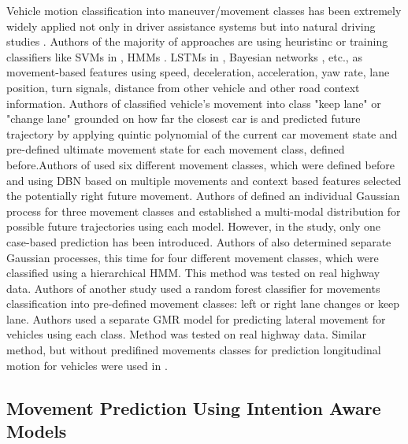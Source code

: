 Vehicle motion classification into maneuver/movement classes has been extremely widely applied not only in driver assistance systems but into natural driving studies \cite{DataDrivenIV, DataDrivenV, DataDrivenVI, mab1, mab2, mab3, mab4, mab5, mab6, mab7}. Authors of the majority of approaches are using heuristinc \cite{mab1} or training classifiers like \glspl{SVM} in \cite{mab2}, \glspl{HMM} \cite{DataDrivenIV, mab3, mab4}. \glspl{LSTM} in \cite{mab5}, Bayesian networks \cite{mab6}, etc., as movement-based features using speed, deceleration, acceleration, yaw rate, lane position, turn signals, distance from other vehicle and other road context information. Authors of \cite{mab1} classified vehicle's movement into class "keep lane" or "change lane" grounded on how far the closest car is and predicted future trajectory by applying quintic polynomial of the current car movement state and pre-defined ultimate movement state for each movement class, defined before.Authors of \cite{mab6} used six different movement classes, which were defined before and using \gls{DBN} based on multiple movements and context based features selected the potentially right future movement. Authors of \cite{mab7} defined an individual Gaussian process for three movement classes and established a multi-modal distribution for possible future trajectories using each model. However, in the study, only one case-based prediction has been introduced. Authors of \cite{DataDrivenIV} also determined separate Gaussian processes, this time for four different movement classes, which were classified using a hierarchical \gls{HMM}. This method was tested on real highway data. Authors of another study \cite{DataDrivenV} used a random forest classifier for movements classification into pre-defined movement classes: left or right lane changes or keep lane. Authors used a separate \gls{GMR} model for predicting lateral movement for vehicles using each class. Method was tested on real highway data. Similar method, but without predifined movements classes for prediction longitudinal motion for vehicles were used in \cite{DataDrivenVI}.

\subsection{Movement Prediction Using Intention Aware Models}
\label{subsection:inaw}

